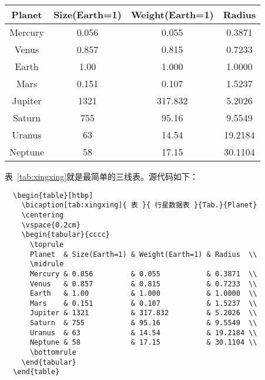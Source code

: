 \begin{table}[htbp]
  \centering
  \vspace{0.2cm}
  \begin{tabular}{cccc}
    \toprule
    Planet  & Size(Earth=1) & Weight(Earth=1) & Radius  \\
    \midrule
    Mercury & 0.056         & 0.055           & 0.3871  \\
    Venus   & 0.857         & 0.815           & 0.7233  \\
    Earth   & 1.00          & 1.000           & 1.0000  \\
    Mars    & 0.151         & 0.107           & 1.5237  \\ 
    Jupiter & 1321          & 317.832         & 5.2026  \\ 
    Saturn  & 755           & 95.16           & 9.5549  \\ 
    Uranus  & 63            & 14.54           & 19.2184 \\ 
    Neptune & 58            & 17.15           & 30.1104 \\ 
    \bottomrule
  \end{tabular}
\end{table}

表~\ref{tab:xingxing}就是最简单的三线表。源代码如下：
\begin{lstlisting}
  \begin{table}[htbp]
    \bicaption[tab:xingxing]{ 表 }{ 行星数据表 }{Tab.}{Planet}
    \centering
    \vspace{0.2cm}
    \begin{tabular}{cccc}
      \toprule
      Planet  & Size(Earth=1) & Weight(Earth=1) & Radius  \\
      \midrule
      Mercury & 0.056         & 0.055           & 0.3871  \\
      Venus   & 0.857         & 0.815           & 0.7233  \\ 
      Earth   & 1.00          & 1.000           & 1.0000  \\ 
      Mars    & 0.151         & 0.107           & 1.5237  \\ 
      Jupiter & 1321          & 317.832         & 5.2026  \\ 
      Saturn  & 755           & 95.16           & 9.5549  \\ 
      Uranus  & 63            & 14.54           & 19.2184 \\ 
      Neptune & 58            & 17.15           & 30.1104 \\
      \bottomrule
    \end{tabular}
  \end{table}
\end{lstlisting}


